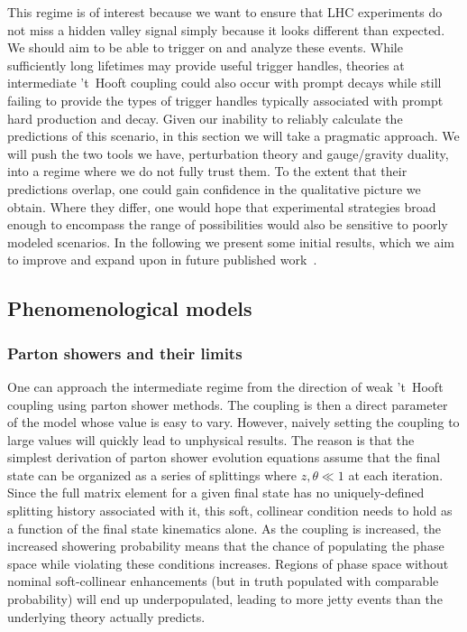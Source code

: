 This regime is of interest because we want to ensure that LHC experiments do not miss a hidden valley signal simply because it looks different than expected. We should aim to be able to trigger on and analyze these events. While sufficiently long lifetimes may provide useful trigger handles, theories at intermediate 't~Hooft coupling could also occur with prompt decays while still failing to provide the types of trigger handles typically associated with prompt hard production and decay. Given our inability to reliably calculate the predictions of this scenario, in this section we will take a pragmatic approach. We will push the two tools we have, perturbation theory and gauge/gravity duality, into a regime where we do not fully trust them. To the extent that their predictions overlap, one could gain confidence in the qualitative picture we obtain. Where they differ, one would hope that experimental strategies broad enough to encompass the range of possibilities would also be sensitive to poorly modeled scenarios. In the following we present some initial results, which we aim to improve and expand upon in future published work~\cite{showersinprogress}. 


\subsection{Phenomenological models}

\subsubsection{Parton showers and their limits}

One can  approach the intermediate regime from the direction of weak 't~Hooft coupling using parton shower methods. The coupling is then a direct parameter of the model whose value is easy to vary. However, naively setting the coupling to large values will quickly lead to unphysical results. The reason is that the simplest derivation of parton shower evolution equations assume that the final state can be organized as a series of splittings where $z, \theta \ll 1$ at each iteration. Since the full matrix element for a given final state has no uniquely-defined splitting history associated with it, this soft, collinear condition needs to hold as a function of the final state kinematics alone. As the coupling is increased, the increased showering probability means that the chance of populating the phase space while violating these conditions increases. Regions of phase space without nominal soft-collinear enhancements (but in truth  populated with comparable probability) will end up underpopulated, leading to more jetty events than the underlying theory actually predicts.

